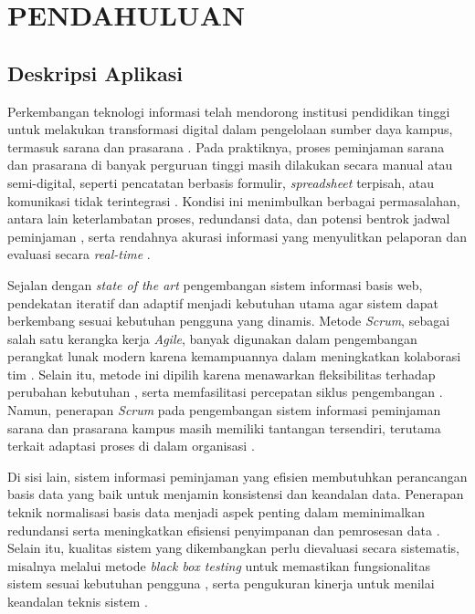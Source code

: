 \chapter{PENDAHULUAN}
\sloppy

\section{Deskripsi Aplikasi}
Perkembangan teknologi informasi telah mendorong institusi pendidikan tinggi untuk melakukan transformasi digital dalam pengelolaan sumber daya kampus, termasuk sarana dan prasarana \parencite{Ramdany2024}. Pada praktiknya, proses peminjaman sarana dan prasarana di banyak perguruan tinggi masih dilakukan secara manual atau semi-digital, seperti pencatatan berbasis formulir, \textit{spreadsheet} terpisah, atau komunikasi tidak terintegrasi \parencite{PutriNabella2025}. Kondisi ini menimbulkan berbagai permasalahan, antara lain keterlambatan proses, redundansi data, dan potensi bentrok jadwal peminjaman \parencite{Purwati2022}, serta rendahnya akurasi informasi yang menyulitkan pelaporan dan evaluasi secara \textit{real-time} \parencite{Velasquez-Jimenez2025}.

Sejalan dengan \textit{state of the art} pengembangan sistem informasi basis web, pendekatan iteratif dan adaptif menjadi kebutuhan utama agar sistem dapat berkembang sesuai kebutuhan pengguna yang dinamis. Metode \textit{Scrum}, sebagai salah satu kerangka kerja \textit{Agile}, banyak digunakan dalam pengembangan perangkat lunak modern karena kemampuannya dalam meningkatkan kolaborasi tim \parencite{Nugraha2021}. Selain itu, metode ini dipilih karena menawarkan fleksibilitas terhadap perubahan kebutuhan \parencite{Rifky2022}, serta memfasilitasi percepatan siklus pengembangan \parencite{permana2015scrum}. Namun, penerapan \textit{Scrum} pada pengembangan sistem informasi peminjaman sarana dan prasarana kampus masih memiliki tantangan tersendiri, terutama terkait adaptasi proses di dalam organisasi \parencite{Putrianasari2024}.

Di sisi lain, sistem informasi peminjaman yang efisien membutuhkan perancangan basis data yang baik untuk menjamin konsistensi dan keandalan data. Penerapan teknik normalisasi basis data menjadi aspek penting dalam meminimalkan redundansi serta meningkatkan efisiensi penyimpanan dan pemrosesan data \parencite{Purwati2022}. Selain itu, kualitas sistem yang dikembangkan perlu dievaluasi secara sistematis, misalnya melalui metode \textit{black box testing} untuk memastikan fungsionalitas sistem sesuai kebutuhan pengguna \parencite{Suwirmayanti2020}, serta pengukuran kinerja untuk menilai keandalan teknis sistem \parencite{Pratama2025}.

